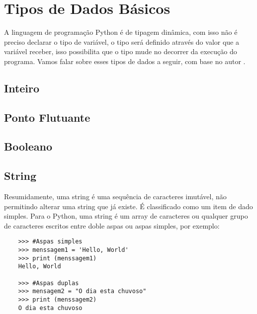     \section{Tipos de Dados B\'{a}sicos}
	A linguagem de programação Python é de tipagem dinâmica, com isso não é preciso declarar o tipo de variável, o tipo será definido através do valor que a variável receber, isso possibilita que o tipo mude no decorrer da execução do programa. Vamos falar sobre esses tipos de dados a seguir, com base no autor \cite{Severance2016}.
	
			\subsection{Inteiro}
			
			\subsection{Ponto Flutuante}
			
			\subsection{Booleano}
			
            \subsection{String}
            Resumidamente, uma string é uma sequência de caracteres imutável, não permitindo alterar uma string que já existe. É classificado como um item de dado simples. Para o Python, uma string é um array de caracteres ou qualquer grupo de caracteres escritos entre doble aspas ou aspas simples, por exemplo:
    \begin{lstlisting}
    >>> #Aspas simples
    >>> menssagem1 = 'Hello, World'
    >>> print (menssagem1)  
    Hello, World
    
    >>> #Aspas duplas
    >>> mensagem2 = "O dia esta chuvoso"
    >>> print (menssagem2)
    O dia esta chuvoso
    \end{lstlisting}
			
